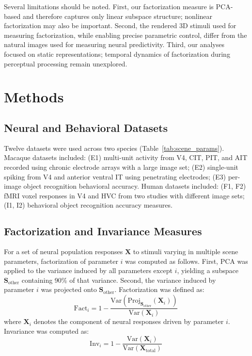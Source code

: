 \documentclass[11pt]{article}
\begin{document}
Several limitations should be noted. First, our factorization measure is PCA-based and therefore captures only linear subspace structure; nonlinear factorization may also be important. Second, the rendered 3D stimuli used for measuring factorization, while enabling precise parametric control, differ from the natural images used for measuring neural predictivity. Third, our analyses focused on static representations; temporal dynamics of factorization during perceptual processing remain unexplored.

\section{Methods}

\subsection{Neural and Behavioral Datasets}

Twelve datasets were used across two species (Table~\ref{tab:scene_params}). Macaque datasets included: (E1) multi-unit activity from V4, CIT, PIT, and AIT recorded using chronic electrode arrays with a large image set; (E2) single-unit spiking from V4 and anterior ventral IT using penetrating electrodes; (E3) per-image object recognition behavioral accuracy. Human datasets included: (F1, F2) fMRI voxel responses in V4 and HVC from two studies with different image sets; (I1, I2) behavioral object recognition accuracy measures.

\subsection{Factorization and Invariance Measures}

For a set of neural population responses $\mathbf{X}$ to stimuli varying in multiple scene parameters, factorization of parameter $i$ was computed as follows. First, PCA was applied to the variance induced by all parameters except $i$, yielding a subspace $\mathbf{S}_{\text{other}}$ containing 90\% of that variance. Second, the variance induced by parameter $i$ was projected onto $\mathbf{S}_{\text{other}}$. Factorization was defined as:
\begin{equation}
\text{Fact}_i = 1 - \frac{\text{Var}(\text{Proj}_{\mathbf{S}_{\text{other}}}(\mathbf{X}_i))}{\text{Var}(\mathbf{X}_i)}
\end{equation}
where $\mathbf{X}_i$ denotes the component of neural responses driven by parameter $i$. Invariance was computed as:
\begin{equation}
\text{Inv}_i = 1 - \frac{\text{Var}(\mathbf{X}_i)}{\text{Var}(\mathbf{X}_{\text{total}})}
\end{equation}
\end{document}
